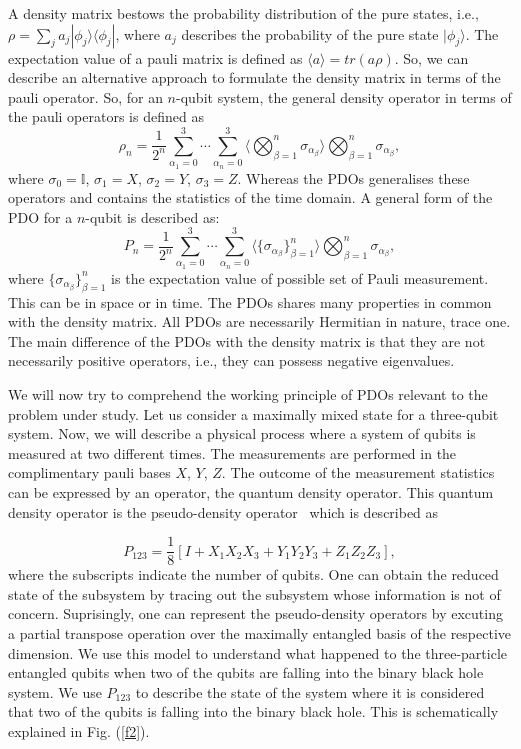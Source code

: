 \documentclass[fleqn,usenatbib]{mnras}
\begin{document}
A density matrix bestows the probability distribution of the pure states, i.e., $\rho = \sum_j a_j |\phi_j\rangle \langle \phi_j|$, where $a_j$ describes the probability of the pure state $|\phi_j \rangle$. The expectation value of a pauli matrix is defined as $\langle a \rangle = tr(a \rho)$. So, we can describe an alternative approach to formulate the density matrix in terms of the pauli operator. So, for an $n$-qubit system, the general density operator in terms of the pauli operators is defined as 
\begin{equation} \label{c}
    \rho_n = \frac{1}{2^n} \sum_{\alpha_1 = 0}^3 \cdots \sum_{\alpha_n=0}^3 \langle \bigotimes_{\beta=1}^n \sigma_{\alpha_{\beta}} \rangle \bigotimes_{\beta=1}^n \sigma_{\alpha_{\beta}},
\end{equation}
where $\sigma_0 = {\mathbb I}$, $\sigma_1 = X$, $\sigma_2 = Y$, $\sigma_3 = Z$. Whereas the PDOs generalises these operators and contains the statistics of the time domain. A general form of the PDO for a $n$-qubit is described as:
\begin{equation} \label{d}
    P_n = \frac{1}{2^n} \sum_{\alpha_1 = 0}^3 \cdots \sum_{\alpha_n=0}^3 \langle  \{\sigma_{\alpha_{\beta}}\}_{\beta=1}^n \rangle \bigotimes_{\beta=1}^n \sigma_{\alpha_{\beta}},
\end{equation}
where $\{\sigma_{\alpha_{\beta}}\}_{\beta=1}^n$ is the expectation value of possible set of Pauli measurement. This can be in space or in time. The PDOs shares many properties in common with the density matrix. All PDOs are necessarily Hermitian in nature, trace one. The main difference of the PDOs with the density matrix is that they are not necessarily positive operators, i.e., they can possess negative eigenvalues. 

We will now try to comprehend the working principle of PDOs relevant to the problem under study. Let us consider a maximally mixed state for a three-qubit system. Now, we will describe a physical process where a system of qubits is measured at two different times. The measurements are performed in the complimentary pauli bases $X$, $Y$, $Z$. The outcome of the measurement statistics can be expressed by an operator, the quantum density operator. This quantum density operator is the pseudo-density operator~\citep{fitz} which is described as 

\begin{equation}\label{e}
    P_{123} = \frac{1}{8} [I + X_1X_2X_3 + Y_1Y_2Y_3 + Z_1Z_2Z_3],
\end{equation}
where the subscripts indicate the number of qubits. One can obtain the reduced state of the subsystem by tracing out the subsystem whose information is not of concern. Suprisingly, one can represent the pseudo-density operators by excuting a partial transpose operation over the maximally entangled basis of the respective dimension. We use this model to understand what happened to the three-particle entangled qubits when two of the qubits are falling into the binary black hole system. We use $P_{123}$ to describe the state of the system where it is considered that two of the qubits is falling into the binary black hole. This is schematically explained in Fig. (\ref{f2}). 
\end{document}
